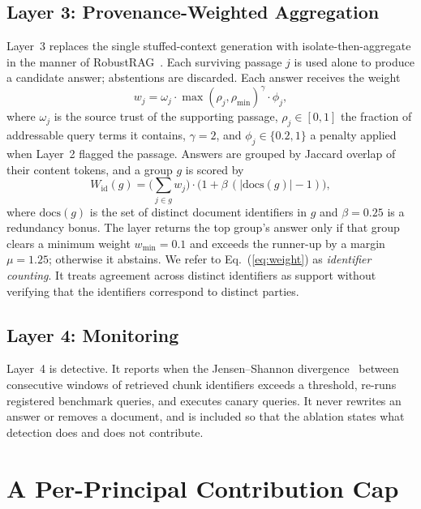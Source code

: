 \documentclass[lettersize,journal]{IEEEtran}
\begin{document}
\subsection{Layer 3: Provenance-Weighted Aggregation}

Layer~3 replaces the single stuffed-context generation with isolate-then-aggregate in the
manner of RobustRAG~\cite{xiang2024robustrag}. Each surviving passage $j$ is used alone to
produce a candidate answer; abstentions are discarded. Each answer receives the weight
\begin{equation}
w_j = \omega_j \cdot \max(\rho_j, \rho_{\min})^{\gamma} \cdot \phi_j ,
\label{eq:wj}
\end{equation}
where $\omega_j$ is the source trust of the supporting passage, $\rho_j \in [0,1]$ the fraction
of addressable query terms it contains, $\gamma = 2$, and $\phi_j \in \{0.2, 1\}$ a penalty
applied when Layer~2 flagged the passage. Answers are grouped by Jaccard overlap of their
content tokens, and a group $g$ is scored by
\begin{equation}
W_{\mathrm{id}}(g) = \Big(\sum_{j \in g} w_j\Big)\cdot
\big(1 + \beta\,(|\mathrm{docs}(g)| - 1)\big),
\label{eq:weight}
\end{equation}
where $\mathrm{docs}(g)$ is the set of distinct document identifiers in $g$ and $\beta = 0.25$
is a redundancy bonus. The layer returns the top group's answer only if that group clears a
minimum weight $w_{\min} = 0.1$ and exceeds the runner-up by a margin $\mu = 1.25$; otherwise
it abstains. We refer to Eq.~(\ref{eq:weight}) as \emph{identifier counting}. It treats
agreement across distinct identifiers as support without verifying that the identifiers
correspond to distinct parties.

\subsection{Layer 4: Monitoring}
\label{sec:l4}

Layer~4 is detective. It reports when the Jensen--Shannon divergence~\cite{lin1991divergence}
between consecutive windows of retrieved chunk identifiers exceeds a threshold, re-runs
registered benchmark queries, and executes canary queries. It never rewrites an answer or
removes a document, and is included so that the ablation states what detection does and does
not contribute.

\section{A Per-Principal Contribution Cap}
\label{sec:cap}
\end{document}
